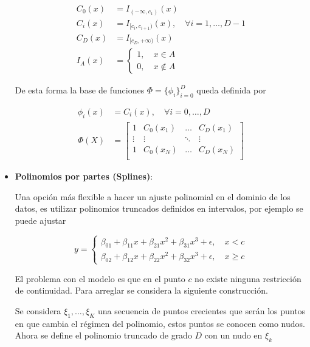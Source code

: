 \begin{itemize}
    \begin{align}
        C_0(x) &= I_{(-\infty,c_1)}(x)\\
        C_i(x) &= I_{[c_i,c_{i+1})}(x), \quad \forall i=1,\ldots,D-1\\
        C_D(x) &= I_{[c_D,+\infty)}(x)\\
        I_A(x) &= \left\{\begin{matrix}
        1,\quad x\in A\\
        0,\quad x\notin A
        \end{matrix}\right.
    \end{align}
    
    De esta forma la base de funciones $\Phi=\{\phi_i\}_{i=0}^D$ queda definida por
    
    \begin{align}
        \phi_i(x) &= C_i(x),\quad \forall i=0,\ldots,D\\
        \Phi(X) &= \left[ \begin{matrix}
        1 & C_0(x_1) & \ldots & C_D(x_1)\\
        \vdots & \vdots  & \ddots & \vdots \\
        1 & C_0(x_N) & \ldots & C_D(x_N)\\
        \end{matrix} \right]
    \end{align}
    
    
    \item{\textbf{Polinomios por partes (Splines)}:}
    
    Una opción más flexible a hacer un ajuste polinomial en el dominio de los datos, es utilizar polinomios truncados definidos en intervalos, por ejemplo se puede ajustar
    
    \begin{equation}
        y = \left\{\begin{matrix}
        \beta_{01}+\beta_{11}x+\beta_{21}x^2+\beta_{31}x^3+\epsilon,\quad x < c\\
        \beta_{02}+\beta_{12}x+\beta_{22}x^2+\beta_{32}x^3+\epsilon,\quad x \geq c
        \end{matrix}\right.
    \end{equation}
    
    El problema con el modelo es que en el punto $c$ no existe ninguna restricción de continuidad. Para arreglar se considera la siguiente construcción.
    
    Se considera $\xi_1,\ldots,\xi_K$ una secuencia de puntos crecientes que serán los puntos en que cambia el régimen del polinomio, estos puntos se conocen como nudos. Ahora se define el polinomio truncado de grado $D$ con un nudo en $\xi_k$
    

\end{itemize}

